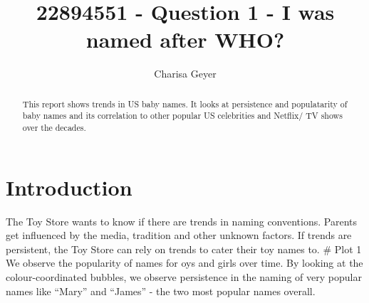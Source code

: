 \documentclass[11pt,preprint]{elsarticle}
\numberwithin{equation}{section}
\numberwithin{figure}{section}
\numberwithin{table}{section}
\begin{document}
\begin{frontmatter}  %

\title{22894551 - Question 1 - I was named after WHO?}





\author[Add1]{Charisa Geyer}





\address[Add1]{Stellenbosch University, Cape Town, South Africa}


\begin{abstract}
\small{
This report shows trends in US baby names. It looks at persistence and
populatarity of baby names and its correlation to other popular US
celebrities and Netflix/ TV shows over the decades.
}
\end{abstract}

\vspace{1cm}





\vspace{0.5cm}

\end{frontmatter}

\setcounter{footnote}{0}



\pagestyle{fancy}
\chead{}
\rhead{}
\lfoot{}
\lhead{}
\cfoot{}


\headsep 35pt %




\section{\texorpdfstring{Introduction
\label{Introduction}}{Introduction }}\label{introduction}

The Toy Store wants to know if there are trends in naming conventions.
Parents get influenced by the media, tradition and other unknown
factors. If trends are persistent, the Toy Store can rely on trends to
cater their toy names to. \newpage \# Plot 1 We observe the popularity
of names for oys and girls over time. By looking at the
colour-coordinated bubbles, we observe persistence in the naming of very
popular names like ``Mary'' and ``James'' - the two most popular names
overall.
\end{document}
